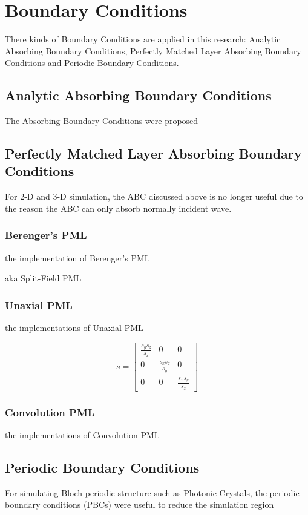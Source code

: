 \section{Boundary Conditions}
\label{sec:bcs}
There kinds of Boundary Conditions are applied in this research: Analytic Absorbing Boundary Conditions, Perfectly
Matched Layer Absorbing Boundary Conditions and Periodic Boundary Conditions.
\subsection{Analytic Absorbing Boundary Conditions}

The Absorbing Boundary Conditions were proposed

\subsection{Perfectly Matched Layer Absorbing Boundary Conditions}
\label{subsec:pml}

For 2-D and 3-D simulation, the ABC discussed above is no longer useful due to the reason the ABC can only absorb
normally incident wave.

\subsubsection{Berenger's PML}
the implementation of Berenger's PML

aka Split-Field PML
\subsubsection{Unaxial PML}
the implementations of Unaxial PML

\begin{equation}
  \bar{\bar{s}} = 
  \begin{bmatrix}
    \displaystyle\frac{s_ys_z}{s_x}& 0& 0\\
    0& \displaystyle\frac{s_xs_z}{s_y}& 0\\
    0& 0& \displaystyle\frac{s_xs_y}{s_z}
  \end{bmatrix}
\end{equation}


\subsubsection{Convolution PML}
the implementations of Convolution PML

\subsection{Periodic Boundary Conditions}

For simulating Bloch periodic structure such as Photonic Crystals, the periodic boundary conditions (PBCs) were useful
to reduce the simulation region
